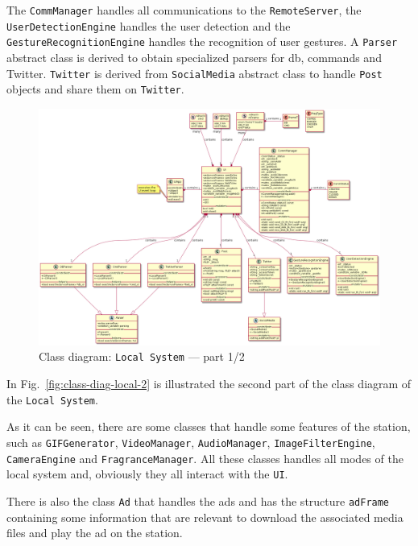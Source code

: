 The \texttt{CommManager} handles all communications to the
\texttt{RemoteServer}, the \texttt{UserDetectionEngine} handles the user
detection and the \texttt{GestureRecognitionEngine} handles the recognition of
user gestures.
%
A \texttt{Parser} abstract class is derived to obtain specialized parsers for
\gls{db}, commands and Twitter. \texttt{Twitter} is derived from
\texttt{SocialMedia} abstract class to handle \texttt{Post} objects and share
them on \texttt{Twitter}.
%
\begin{figure}[htb!]
\centering
    \includegraphics[width=1.0\columnwidth]{./img/class-diag-local-1.png}
  \caption{Class diagram: \texttt{Local System} --- part 1/2}%
\label{fig:class-diag-local-1}
\end{figure}

In Fig.~\ref{fig:class-diag-local-2} is illustrated the second part of the class diagram of the \texttt{Local System}.

As it can be seen, there are some classes that handle some features of the station, such as \texttt{GIFGenerator}, \texttt{VideoManager}, \texttt{AudioManager}, \texttt{ImageFilterEngine}, \texttt{CameraEngine} and \texttt{FragranceManager}. All these classes handles all modes of the local system and, obviously they all interact with the \texttt{UI}.

There is also the class \texttt{Ad} that handles the ads and has the structure
\texttt{adFrame} containing some information that are relevant to download the
associated media
files and play the ad on the station.

